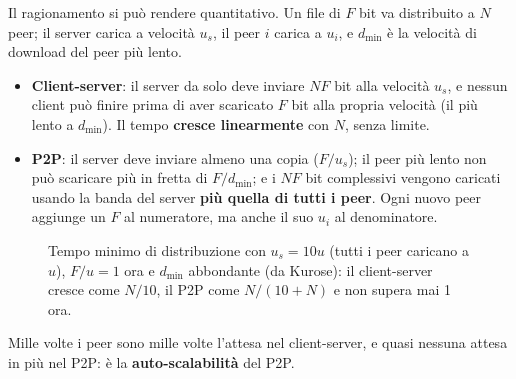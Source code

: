 Il ragionamento si può rendere quantitativo. Un file di $F$ bit va distribuito a $N$ peer; il server carica a
velocità $u_s$, il peer $i$ carica a $u_i$, e $d_{\min}$ è la velocità di download del peer più lento.


\begin{itemize}
    \item \textbf{Client-server}: il server da solo deve inviare $N F$ bit alla velocità $u_s$, e nessun client può
          finire prima di aver scaricato $F$ bit alla propria velocità (il più lento a $d_{\min}$). Il tempo
          \textbf{cresce linearmente} con $N$, senza limite.
    \item \textbf{P2P}: il server deve inviare almeno una copia ($F/u_s$); il peer più lento non può scaricare più
          in fretta di $F/d_{\min}$; e i $N F$ bit complessivi vengono caricati usando la banda del server
          \textbf{più quella di tutti i peer}. Ogni nuovo peer aggiunge un $F$ al numeratore, ma anche il suo $u_i$
          al denominatore.
\end{itemize}

\begin{figure}[H]
\centering
{}
\caption{Tempo minimo di distribuzione con $u_s = 10u$ (tutti i peer caricano a $u$), $F/u = 1$ ora e $d_{\min}$ abbondante (da Kurose): il client-server cresce come $N/10$, il P2P come $N/(10+N)$ e non supera mai 1 ora.}
\end{figure}

Mille volte i peer sono mille volte l'attesa nel client-server, e quasi nessuna attesa in più nel P2P: è la
\textbf{auto-scalabilità} del P2P.


